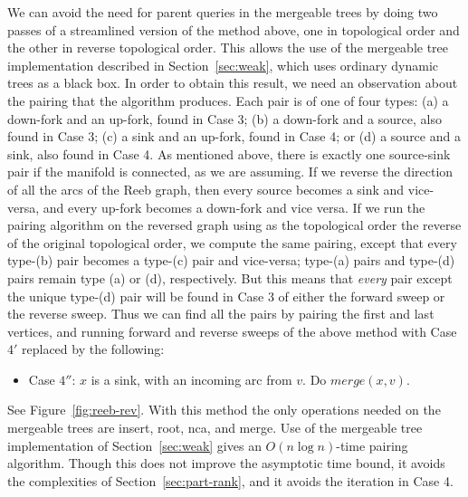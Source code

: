 \documentclass[twoside,leqno,twocolumn]{article}
\begin{document}
We can avoid the need for parent queries in the mergeable trees by doing two passes of a streamlined version of the method above, one in topological order and the other in reverse topological order.  This allows the use of the mergeable tree implementation described in Section~\ref{sec:weak}, which uses ordinary dynamic trees as a black box.  In order to obtain this result, we need an observation about the pairing that the algorithm produces.  Each pair is of one of four types: (a) a down-fork and an up-fork, found in Case 3; (b) a down-fork and a source, also found in Case 3; (c) a sink and an up-fork, found in Case 4; or (d) a source and a sink, also found in Case 4.  As mentioned above, there is exactly one source-sink pair if the manifold is connected, as we are assuming. If we reverse the direction of all the arcs of the Reeb graph, then every source becomes a sink and vice-versa, and every up-fork becomes a down-fork and vice versa.  If we run the pairing algorithm on the reversed graph using as the topological order the reverse of the original topological order, we compute the same pairing, except that every type-(b) pair becomes a type-(c) pair and vice-versa; type-(a) pairs and type-(d) pairs remain type (a) or (d), respectively.  But this means that \emph{every} pair except the unique type-(d) pair will be found in Case 3 of either the forward sweep or the reverse sweep.  Thus we can find all the pairs by pairing the first and last vertices, and running forward and reverse sweeps of the above method with Case $4'$ replaced by the following:
\begin{itemize}
\item Case $4''$: $x$ is a sink, with an incoming arc from $v$. Do $\mathit{merge}(x, v)$.
\end{itemize}
See Figure~\ref{fig:reeb-rev}. With this method the only operations needed on the mergeable trees are insert, root, nca, and merge.  Use of the mergeable tree implementation of Section~\ref{sec:weak} gives an $O(n\log n)$-time pairing algorithm.  Though this does not improve the asymptotic time bound, it avoids the complexities of Section~\ref{sec:part-rank}, and it avoids the iteration in Case 4.
\end{document}
